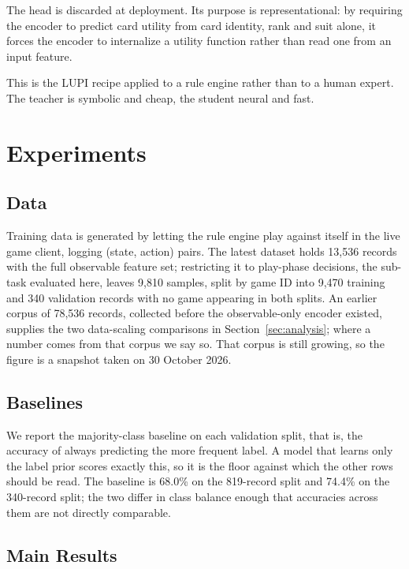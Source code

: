 \documentclass[11pt]{article}
\begin{document}
The head is discarded at deployment. Its purpose is representational: by requiring the
encoder to predict card utility from card identity, rank and suit alone, it forces the
encoder to internalize a utility function rather than read one from an input feature.

This is the LUPI recipe applied to a rule engine rather than to a human expert. The teacher
is symbolic and cheap, the student neural and fast.

\section{Experiments}
\label{sec:experiments}

\subsection{Data}

Training data is generated by letting the rule engine play against itself in the live game
client, logging (state, action) pairs. The latest dataset holds 13,536 records with the full
observable feature set; restricting it to play-phase decisions, the sub-task evaluated here,
leaves 9,810 samples, split by game ID into 9,470 training and 340 validation records with
no game appearing in both splits. An earlier corpus of 78,536 records, collected before the
observable-only encoder existed, supplies the two data-scaling comparisons in
Section~\ref{sec:analysis}; where a number comes from that corpus we say so. That corpus is
still growing, so the figure is a snapshot taken on 30 October 2026.

\subsection{Baselines}

We report the majority-class baseline on each validation split, that is, the accuracy of
always predicting the more frequent label. A model that learns only the label prior scores
exactly this, so it is the floor against which the other rows should be read. The baseline
is 68.0\% on the 819-record split and 74.4\% on the 340-record split; the two differ in
class balance enough that accuracies across them are not directly comparable.

\subsection{Main Results}
\end{document}
